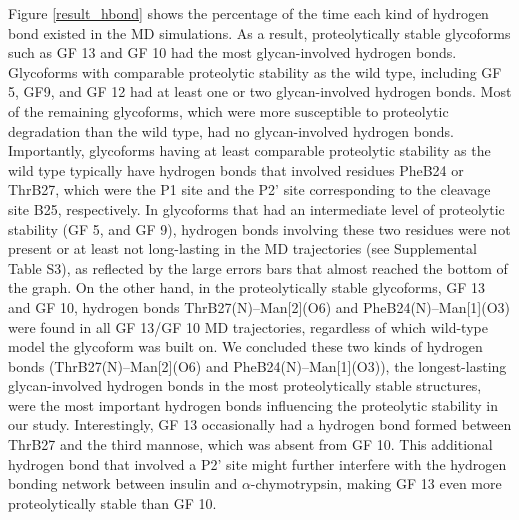 \documentclass[9pt]{elife}
\begin{document}
Figure \ref{result_hbond} shows the percentage of the time each kind of hydrogen bond existed in the MD simulations. As a result, proteolytically stable glycoforms such as GF 13 and GF 10 had the most glycan-involved hydrogen bonds. Glycoforms with comparable proteolytic stability as the wild type, including GF 5, GF9, and GF 12 had at least one or two glycan-involved hydrogen bonds. Most of the remaining glycoforms, which were more susceptible to proteolytic degradation than the wild type, had no glycan-involved hydrogen bonds. Importantly, glycoforms having at least comparable proteolytic stability as the wild type typically have hydrogen bonds that involved residues PheB24 or ThrB27, which were the P1 site and the P2' site corresponding to the cleavage site B25, respectively. In glycoforms that had an intermediate level of proteolytic stability (GF 5, and GF 9), hydrogen bonds involving these two residues were not present or at least not long-lasting in the MD trajectories (see Supplemental Table S3), as reflected by the large errors bars that almost reached the bottom of the graph. On the other hand, in the proteolytically stable glycoforms, GF 13 and GF 10, hydrogen bonds ThrB27(N)--Man[2](O6) and PheB24(N)--Man[1](O3) were found in all GF 13/GF 10 MD trajectories, regardless of which wild-type model the glycoform was built on. We concluded these two kinds of hydrogen bonds (ThrB27(N)--Man[2](O6) and PheB24(N)--Man[1](O3)), the longest-lasting glycan-involved hydrogen bonds in the most proteolytically stable structures, were the most important hydrogen bonds influencing the proteolytic stability in our study. Interestingly, GF 13 occasionally had a hydrogen bond formed between ThrB27 and the third mannose, which was absent from GF 10. This additional hydrogen bond that involved a P2' site might further interfere with the hydrogen bonding network between insulin and $\alpha$-chymotrypsin, making GF 13 even more proteolytically stable than GF 10. 
\end{document}

